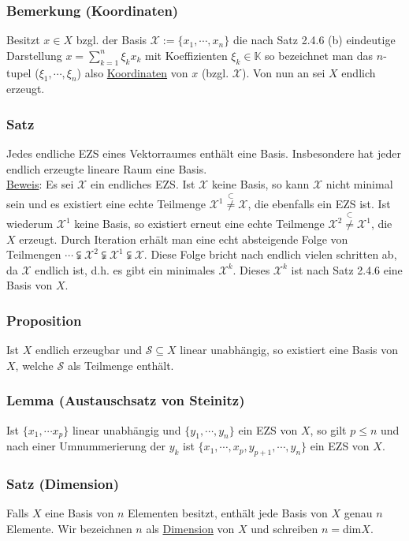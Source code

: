 \subsubsection{Bemerkung (Koordinaten)}
Besitzt $x\in X$ bzgl. der Basis $\mathcal{X}:=\{x_1,\cdots ,x_n\}$ die nach Satz 2.4.6 (b) eindeutige Darstellung $x=\sum_{k=1}^n \xi _k x_k$ mit Koeffizienten $\xi _k \in \mathbb{K}$ so bezeichnet man das $n$-tupel ($\xi _1,\cdots ,\xi _n$) also \underline{Koordinaten} von $x$ (bzgl. $\mathcal{X}$).  Von nun an sei $X$ endlich erzeugt.
\subsubsection{Satz}
Jedes endliche EZS eines Vektorraumes enthält eine Basis.  Insbesondere hat jeder endlich erzeugte lineare Raum eine Basis.\\
\underline{Beweis}:
Es sei $\mathcal{X}$ ein endliches EZS.  Ist $\mathcal{X}$ keine Basis, so kann $\mathcal{X}$ nicht minimal sein und es existiert eine echte Teilmenge $\mathcal{X}^1 \stackrel{\subset}{\not=} \mathcal{X}$, die ebenfalls ein EZS ist.  Ist wiederum $\mathcal{X}^1$ keine Basis, so existiert erneut eine echte Teilmenge $\mathcal{X}^2 \stackrel{\subset}{\not=} \mathcal{X}^1$, die $X$ erzeugt.  Durch Iteration erhält man eine echt absteigende Folge von Teilmengen $\cdots \subsetneqq \mathcal{X}^2 \subsetneqq \mathcal{X}^1 \subsetneqq \mathcal{X}$.  Diese Folge bricht nach endlich vielen schritten ab, da $\mathcal{X}$ endlich ist, d.h. es gibt ein minimales $\mathcal{X}^k$.  Dieses $\mathcal{X}^k$ ist nach Satz 2.4.6 eine Basis von $X$.
\subsubsection{Proposition}
Ist $X$ endlich erzeugbar und $\mathcal{S}\subseteq X$ linear unabhängig, so existiert eine Basis von $X$, welche $\mathcal{S}$ als Teilmenge enthält.
\subsubsection{Lemma (Austauschsatz von Steinitz)}
Ist $\{x_1,\cdots x_p\}$ linear unabhängig und $\{y_1,\cdots ,y_n\}$ ein EZS von $X$, so gilt $p\leq n$ und nach einer Umnummerierung der $y_k$ ist $\{x_1,\cdots ,x_p,y_{p+1},\cdots ,y_n\}$ ein EZS von $X$.
\subsubsection{Satz (Dimension)}
Falls $X$ eine Basis von $n$ Elementen besitzt, enthält jede Basis von $X$ genau $n$ Elemente.  Wir bezeichnen $n$ als \underline{Dimension} von $X$ und schreiben $n=$dim$X$.
